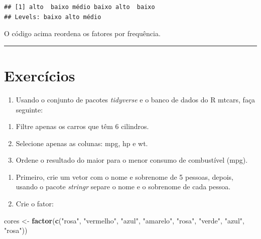 \documentclass[
]{book}
\newenvironment{Shaded}{\begin{snugshade}}{\end{snugshade}}
\newcommand{\FunctionTok}[1]{\textcolor[rgb]{0.13,0.29,0.53}{\textbf{#1}}}
\newcommand{\NormalTok}[1]{#1}
\newcommand{\OtherTok}[1]{\textcolor[rgb]{0.56,0.35,0.01}{#1}}
\newcommand{\StringTok}[1]{\textcolor[rgb]{0.31,0.60,0.02}{#1}}
\providecommand{\tightlist}{%
  \setlength{\itemsep}{0pt}\setlength{\parskip}{0pt}}
\begin{document}
\begin{verbatim}
## [1] alto  baixo médio baixo alto  baixo
## Levels: baixo alto médio
\end{verbatim}

O código acima reordena os fatores por frequência.

\begin{center}\rule{0.5\linewidth}{0.5pt}\end{center}

\section{Exercícios}\label{exercuxedcios-1}

\begin{enumerate}
\def\labelenumi{\arabic{enumi}.}
\tightlist
\item
  Usando o conjunto de pacotes \emph{tidyverse} e o banco de dados do R mtcars, faça seguinte:
\end{enumerate}

\begin{enumerate}
\def\labelenumi{(\alph{enumi})}
\tightlist
\item
  Filtre apenas os carros que têm 6 cilindros.
\item
  Selecione apenas as colunas: mpg, hp e wt.
\item
  Ordene o resultado do maior para o menor consumo de combustível (mpg).
\end{enumerate}

\begin{enumerate}
\def\labelenumi{\arabic{enumi}.}
\setcounter{enumi}{1}
\item
  Primeiro, crie um vetor com o nome e sobrenome de 5 pessoas, depois, usando o pacote \emph{stringr} separe o nome e o sobrenome de cada pessoa.
\item
  Crie o fator:
\end{enumerate}

\begin{Shaded}
\begin{Highlighting}[]
\NormalTok{cores }\OtherTok{\textless{}{-}} \FunctionTok{factor}\NormalTok{(}\FunctionTok{c}\NormalTok{(}\StringTok{"rosa"}\NormalTok{, }\StringTok{"vermelho"}\NormalTok{, }\StringTok{"azul"}\NormalTok{, }\StringTok{"amarelo"}\NormalTok{, }\StringTok{"rosa"}\NormalTok{, }
                  \StringTok{"verde"}\NormalTok{, }\StringTok{"azul"}\NormalTok{, }\StringTok{"rosa"}\NormalTok{))}
\end{Highlighting}
\end{Shaded}
\end{document}
